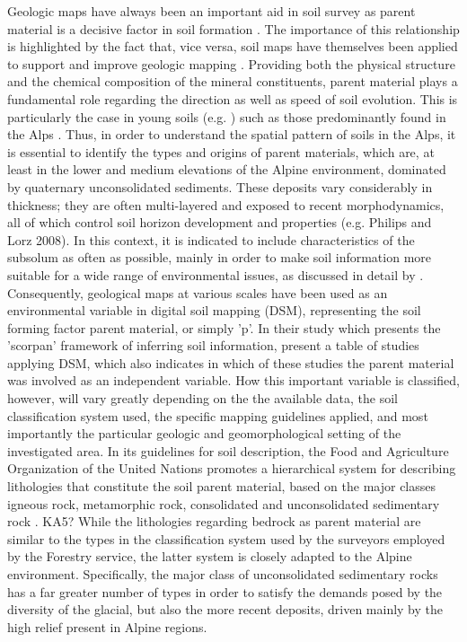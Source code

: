 \documentclass[preprint,12pt,authoryear]{elsarticle}
\begin{document}
Geologic maps have always been an important aid in soil survey as parent material is a decisive factor in soil formation \citep{Jenny1941}. The importance of this relationship is highlighted by the fact that, vice versa, soil maps have themselves been applied to support and improve geologic mapping \citep{Brevik2015}. Providing both the physical structure and the chemical composition of the mineral constituents, parent material plays a fundamental role regarding the direction as well as speed of soil evolution.  This is particularly the case in young soils (e.g. \cite{Schaetzl2000}) such as those predominantly found in the Alps \citep{Geitner2017}. Thus, in order to understand the spatial pattern of soils in the Alps, it is essential to identify the types and origins of parent materials, which are, at least in the lower and medium elevations of the Alpine environment, dominated by quaternary unconsolidated sediments. These deposits vary considerably in thickness; they are often multi-layered and exposed to recent morphodynamics, all of which control soil horizon development and properties (e.g. Philips and Lorz 2008). In this context, it is indicated to include characteristics of the subsolum as often as possible, mainly in order to make soil information more suitable for a wide range of environmental issues, as discussed in detail by \cite{Juilleret2016}. Consequently, geological maps at various scales have been used as an environmental variable in digital soil mapping (DSM), representing the soil forming factor parent material, or simply 'p'. In their study  which presents the 'scorpan' framework of inferring soil information, \cite{McBratney2003} present a table of studies applying DSM, which also indicates in which of these studies the parent material was involved as an independent variable. How this important variable is classified, however, will vary greatly depending on the the available data, the soil classification system used, the specific mapping guidelines applied, and most importantly the particular geologic and geomorphological setting of the investigated area. In its guidelines for soil description, the Food and Agriculture Organization of the United Nations promotes a hierarchical system for describing lithologies that constitute the soil parent material, based on the major classes igneous rock, metamorphic rock, consolidated and unconsolidated sedimentary rock \citep{FAO2006}. KA5? While the lithologies regarding bedrock as parent material are similar to the types in the classification system used by the surveyors employed by the Forestry service, the latter system is closely adapted to the Alpine environment. Specifically, the major class of unconsolidated sedimentary rocks has a far greater number of types in order to satisfy the demands posed by the diversity of the glacial, but also the more recent deposits, driven mainly by the high relief present in Alpine regions.
\end{document}
